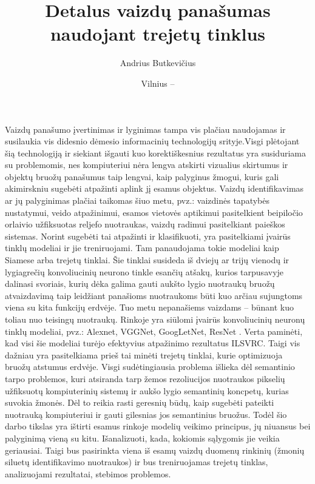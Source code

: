 \documentclass{VUMIFPSkursinis}
\title{Detalus vaizdų panašumas naudojant trejetų tinklus}
\author{Andrius Butkevičius}
\date{Vilnius – \the\year }
\begin{document}
\maketitle
\thispagestyle{empty} 

\tableofcontents



\thispagestyle{empty} 
Vaizdų panašumo įvertinimas ir lyginimas tampa vis plačiau naudojamas ir susilaukia vis didesnio dėmesio informacinių technologijų srityje.Visgi plėtojant šią technologiją ir siekiant išgauti kuo korektiškesnius rezultatus yra susiduriama su problemomis, nes kompiuteriui nėra lengva atskirti vizualius skirtumus ir objektų bruožų panašumus taip lengvai, kaip palyginus žmogui, kuris gali akimirskniu sugebėti atpažinti aplink jį esamus objektus. Vaizdų identifikavimas ar jų palyginimas plačiai taikomas šiuo metu, pvz.: vaizdinės tapatybės nustatymui, veido atpažinimui, esamos vietovės aptikimui pasitelkient beipiločio orlaivio užfiksuotas reljefo nuotraukas, vaizdų radimui pasitelkiant paieškos sistemas. Norint sugebėti tai atpažinti ir klasifikuoti, yra pasitelkiami įvairūs tinklų modeliai ir jie treniruojami. Tam panaudojama tokie modeliai kaip Siamese arba trejetų tinklai. Šie tinklai susideda iš dviejų ar trijų vienodų ir lygiagrečių konvoliucinių neurono tinkle esančių atšakų, kurios tarpusavyje dalinasi svoriais, kurių dėka galima gauti aukšto lygio nuotraukų bruožų atvaizdavimą taip leidžiant panašioms nuotraukoms būti kuo arčiau sujungtoms viena su kita funkcijų erdvėje. Tuo metu nepanašiems vaizdams – būnant kuo toliau nuo teisingų nuotraukų. 
\newline	
Rinkoje yra siūlomi įvairūs konvoliucinių neuronų tinklų modeliai, pvz.: Alexnet, VGGNet, GoogLetNet, ResNet \cite{Aerial_image_similarity}. Verta paminėti, kad visi šie modeliai turėjo efektyvius atpažinimo rezultatus ILSVRC. Taigi vis dažniau yra pasitelkiama prieš tai minėti trejetų tinklai, kurie optimizuoja bruožų atstumus erdvėje. Visgi sudėtingiausia problema išlieka dėl semantinio tarpo problemos, kuri atsiranda tarp žemos rezoliucijos nuotraukos pikselių užfiksuotų kompiuterinių sistemų ir aukšo lygio semantinių koncpetų, kurias suvokia žmonės. Dėl to reikia rasti geresnių būdų, kaip sugebėti pateikti nuotrauką kompiuteriui ir gauti gilesnias jos semantinius bruožus. 
\newline
Todėl šio darbo tikslas yra ištirti esamus rinkoje modelių veikimo principus, jų niuansus bei palyginimą vieną su kitu. Išanalizuoti, kada, kokiomis sąlygomis jie veikia geriausiai. Taigi bus pasirinkta viena iš esamų vaizdų duomenų rinkinių (žmonių siluetų identifikavimo nuotraukos) ir bus treniruojamas trejetų tinklas\cite{Aerial_image_similarity}, analizuojami rezultatai, stebimos problemos.
\end{document}
